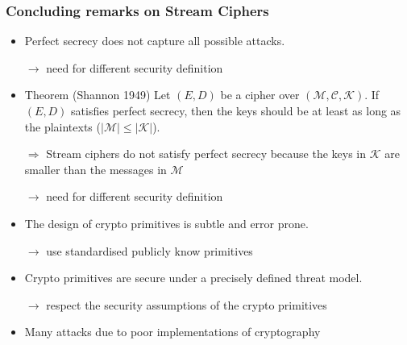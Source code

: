 \documentclass[aspectratio=169, lualatex, handout, 10pt,dvipsnames,svgnames]{beamer} %
\def\enrouge#1{\textcolor{rouge}{#1}}
\newcommand{\Ccal}{\mathcal{C}}
\newcommand{\Kcal}{\mathcal{K}}
\newcommand{\Mcal}{\mathcal{M}}
\begin{document}
\begin{frame}
  \frametitle{Concluding remarks on Stream Ciphers}
  \pause

  \begin{itemize}
  \item Perfect secrecy does not capture all possible attacks.
    
    \enrouge{$\longrightarrow$ need for different security definition}
    \medskip
    \pause

  \item Theorem (Shannon 1949) Let $(E, D)$ be a cipher over $(\Mcal, \Ccal, \Kcal)$. If $(E, D)$ satisfies perfect secrecy, then the keys should be at least as long as the plaintexts ($|\Mcal|\le |\Kcal| $).

    $\Rightarrow$ Stream ciphers do not satisfy perfect secrecy because the keys in $\Kcal$ are smaller than the messages in $\Mcal$

    \enrouge{$\longrightarrow$ need for different security definition}
    \medskip
    \pause

  \item The design of crypto primitives is subtle and error prone.

    \enrouge{$\longrightarrow$ use standardised publicly know primitives}
    \medskip
    \pause
    
  \item Crypto primitives are secure under a precisely defined threat model.

    \enrouge{$\longrightarrow$ respect the security assumptions of the crypto primitives}
    \medskip
    \pause

  \item Many attacks due to poor implementations of cryptography
  \end{itemize}

\end{frame}

\date{}
\author{}

\begin{frame}
  \maketitle
\end{frame}
\end{document}

